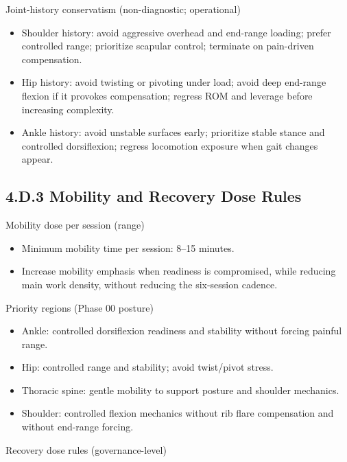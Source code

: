 \documentclass[10pt]{article}
\begin{document}
Joint-history conservatism (non-diagnostic; operational)

\begin{itemize}
\item Shoulder history: avoid aggressive overhead and end-range loading; prefer controlled range; prioritize scapular control; terminate on pain-driven compensation.
\item Hip history: avoid twisting or pivoting under load; avoid deep end-range flexion if it provokes compensation; regress ROM and leverage before increasing complexity.
\item Ankle history: avoid unstable surfaces early; prioritize stable stance and controlled dorsiflexion; regress locomotion exposure when gait changes appear.
\end{itemize}

\subsection*{4.D.3 Mobility and Recovery Dose Rules}
{}

Mobility dose per session (range)

\begin{itemize}
\item Minimum mobility time per session: 8–15 minutes.
\item Increase mobility emphasis when readiness is compromised, while reducing main work density, without reducing the six-session cadence.
\end{itemize}

Priority regions (Phase 00 posture)

\begin{itemize}
\item Ankle: controlled dorsiflexion readiness and stability without forcing painful range.
\item Hip: controlled range and stability; avoid twist/pivot stress.
\item Thoracic spine: gentle mobility to support posture and shoulder mechanics.
\item Shoulder: controlled flexion mechanics without rib flare compensation and without end-range forcing.
\end{itemize}

Recovery dose rules (governance-level)
\end{document}
